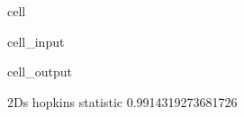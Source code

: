 \documentclass[letterpaper,10pt,english]{jupyterBook}
\begin{document}
\begin{sphinxuseclass}{cell}\begin{sphinxVerbatimInput}

\begin{sphinxuseclass}{cell_input}
\begin{sphinxVerbatim}[commandchars=\\\{\}]
\PYG{p}{[}\PYG{p}{]}
\end{sphinxVerbatim}

\end{sphinxuseclass}\end{sphinxVerbatimInput}
\begin{sphinxVerbatimOutput}

\begin{sphinxuseclass}{cell_output}
\begin{sphinxVerbatim}[commandchars=\\\{\}]
2D\PYGZsq{}s hopkins statistic 0.9914319273681726
\end{sphinxVerbatim}

\end{sphinxuseclass}\end{sphinxVerbatimOutput}

\end{sphinxuseclass}
\end{document}
